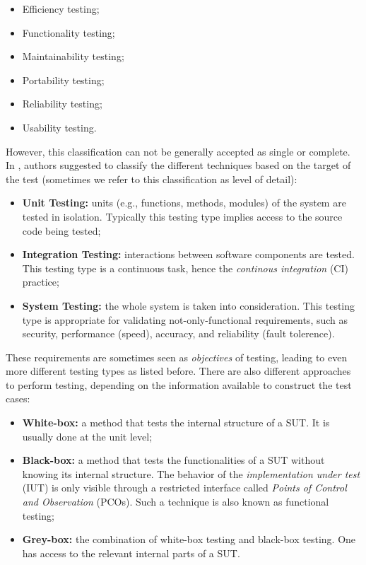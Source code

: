 \begin{itemize}
\item Efficiency testing;
\item Functionality testing;
\item Maintainability testing;
\item Portability testing;
\item Reliability testing;
\item Usability testing.
\end{itemize}

However, this classification can not be generally accepted as
single or complete. In \cite{4425813}, authors suggested to
classify the different techniques based on the target of the
test (sometimes we refer to this classification as level of
detail):

\begin{itemize}
\item \textbf{Unit Testing:} units (e.g., functions, methods,
modules) of the system are tested in isolation. Typically this
testing type implies access to the source code being tested;

\item \textbf{Integration Testing:} interactions between software
components are tested. This testing type is a continuous task,
hence the \textit{continous integration} (CI) practice;

\item \textbf{System Testing:} the whole system is taken into
consideration. This testing type is appropriate for validating
not-only-functional requirements, such as security, performance
(speed), accuracy, and reliability (fault tolerence).
\end{itemize}

These requirements are sometimes seen as \textit{objectives} of
testing, leading to even more different testing types as listed
before. There are also different approaches to perform testing,
depending on the information available to construct the test
cases:

\begin{itemize}
    \item \textbf{White-box:} a method that tests the internal
        structure of a SUT. It is usually done at the unit level;

    \item \textbf{Black-box:} a method that tests the functionalities
        of a SUT without knowing its internal structure. The behavior
        of the \textit{implementation under test} (IUT) is only
        visible through a restricted interface called \textit{Points
        of Control and Observation} (PCOs). Such a technique is also
        known as functional testing;

    \item \textbf{Grey-box:} the combination of white-box testing and
        black-box testing. One has access to the relevant internal
        parts of a SUT.
\end{itemize}

